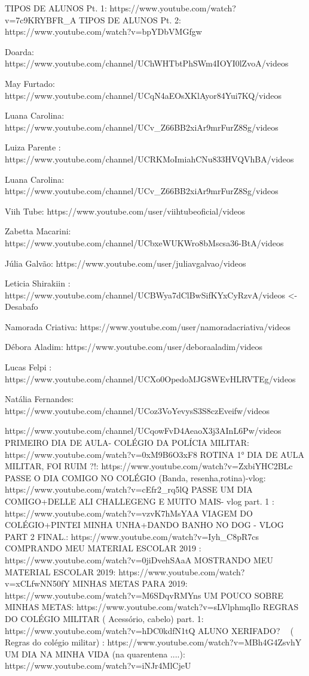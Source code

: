 \iffalse
TIPOS DE ALUNOS Pt. 1: https://www.youtube.com/watch?v=7c9KRYBFR_A
TIPOS DE ALUNOS Pt. 2: https://www.youtube.com/watch?v=bpYDbVMGfgw


Doarda: https://www.youtube.com/channel/UChWHTbtPhSWm4IOYI0lZvoA/videos

May Furtado: https://www.youtube.com/channel/UCqN4aEOsXKlAyor84Yui7KQ/videos

Luana Carolina: https://www.youtube.com/channel/UCv_Z66BB2xiAr9mrFurZ8Sg/videos

Luiza Parente : https://www.youtube.com/channel/UCRKMoImiahCNu833HVQVhBA/videos

Luana Carolina: https://www.youtube.com/channel/UCv_Z66BB2xiAr9mrFurZ8Sg/videos

Viih Tube: https://www.youtube.com/user/viihtubeoficial/videos

Zabetta Macarini: https://www.youtube.com/channel/UCbxeWUKWro8bMscsa36-BtA/videos

Júlia Galvão: https://www.youtube.com/user/juliavgalvao/videos

Leticia Shirakiin : https://www.youtube.com/channel/UCBWya7dClBwSifKYxCyRzvA/videos   <- Desabafo

Namorada Criativa: https://www.youtube.com/user/namoradacriativa/videos

Débora Aladim: https://www.youtube.com/user/deboraaladim/videos

Lucas Felpi : https://www.youtube.com/channel/UCXo0OpedoMJG8WEvHLRVTEg/videos

Natália Fernandes: https://www.youtube.com/channel/UCoz3VoYevysS3S8czEveifw/videos

https://www.youtube.com/channel/UCqowFvD4AeaoX3j3AInL6Pw/videos
PRIMEIRO DIA DE AULA- COLÉGIO DA POLÍCIA MILITAR: https://www.youtube.com/watch?v=0xM9B6O3xF8
ROTINA 1° DIA DE AULA MILITAR, FOI RUIM ?!: https://www.youtube.com/watch?v=ZxbiYHC2BLc
PASSE O DIA COMIGO NO COLÉGIO (Banda, resenha,rotina)-vlog: https://www.youtube.com/watch?v=cEfr2_rq5lQ
PASSE UM DIA COMIGO+DELLE ALI CHALLEGENG E MUITO MAIS- vlog part. 1 : https://www.youtube.com/watch?v=vzvK7hMsYAA
VIAGEM DO COLÉGIO+PINTEI MINHA UNHA+DANDO BANHO NO DOG - VLOG PART 2 FINAL.: https://www.youtube.com/watch?v=Iyh_C8pR7cs
COMPRANDO MEU MATERIAL ESCOLAR 2019 : https://www.youtube.com/watch?v=0jiDvehSAaA
MOSTRANDO MEU MATERIAL ESCOLAR 2019: https://www.youtube.com/watch?v=xCLfwNN50fY
MINHAS METAS PARA 2019: https://www.youtube.com/watch?v=M6SDqvRMYns
UM POUCO SOBRE MINHAS METAS: https://www.youtube.com/watch?v=sLVlphmqIlo
REGRAS DO COLÉGIO MILITAR ( Acessório, cabelo) part. 1: https://www.youtube.com/watch?v=hDC0kdfN1tQ
ALUNO XERIFADO? 👮🏻 ( Regras do colégio militar) : https://www.youtube.com/watch?v=MBh4G4ZsvhY
UM DIA NA MINHA VIDA (na quarentena ....): https://www.youtube.com/watch?v=iNJr4MlCjeU

